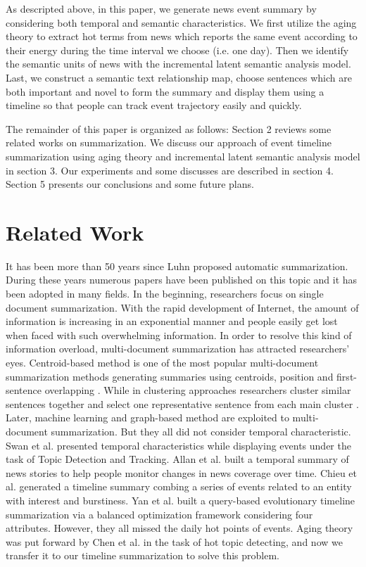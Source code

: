 \documentclass[runningheads,a4paper]{llncs}
\begin{document}
As descripted above, in this paper, we generate news event summary by considering both temporal and semantic characteristics. We first utilize the aging theory \cite{2003-Chen-p47-59} to extract hot terms from news which reports the same event according to their energy during the time interval we choose (i.e. one day). Then we identify the semantic units of news with the incremental latent semantic analysis model. Last, we construct a semantic text relationship map, choose sentences which are both important and novel to form the summary and display them using a timeline so that people can track event trajectory easily and quickly.

The remainder of this paper is organized as follows: Section 2 reviews some related works on summarization. We discuss our approach of event timeline summarization using aging theory and incremental latent semantic analysis model in section 3. Our experiments and some discusses are described in section 4. Section 5 presents our conclusions and some future plans.

\section{Related Work}

It has been more than 50 years since Luhn \cite{1958-Luhn-p159-165} proposed automatic summarization. During these years numerous papers have been published on this topic and it has been adopted in many fields. In the beginning, researchers focus on single document summarization. With the rapid development of Internet, the amount of information is increasing in an exponential manner and people easily get lost when faced with such overwhelming information. In order to resolve this kind of information overload, multi-document summarization has attracted researchers' eyes. Centroid-based method is one of the most popular multi-document summarization methods generating summaries using centroids, position and first-sentence overlapping \cite{2004-Radev-p919-938}. While in clustering approaches researchers cluster similar sentences together and select one representative sentence from each main cluster \cite{1997-Salton-p193-207,2005-Harabagiu-p202-209}. Later, machine learning \cite{2008-Wong-p985-992} and graph-based method \cite{2004-Erkan-p365-371,2005-Mihalcea-p-} are exploited to multi-document summarization. But they all did not consider temporal characteristic.
Swan et al. \cite{2000-Swan-p49-56} presented temporal characteristics while displaying events under the task of Topic Detection and Tracking. Allan et al. \cite{2001-Allan-p10-18} built a temporal summary of news stories to help people monitor changes in news coverage over time. Chieu et al. \cite{2004-Chieu-p425-432} generated a timeline summary combing a series of events related to an entity with interest and burstiness. Yan et al.\cite{2011-Yan-p745-754} built a query-based evolutionary timeline summarization via a balanced optimization framework considering four attributes. However, they all missed the daily hot points of events. Aging theory was put forward by Chen et al. \cite{1990-Deerwester-p391-407} in the task of hot topic detecting, and now we transfer it to our timeline summarization to solve this problem.
\end{document}
